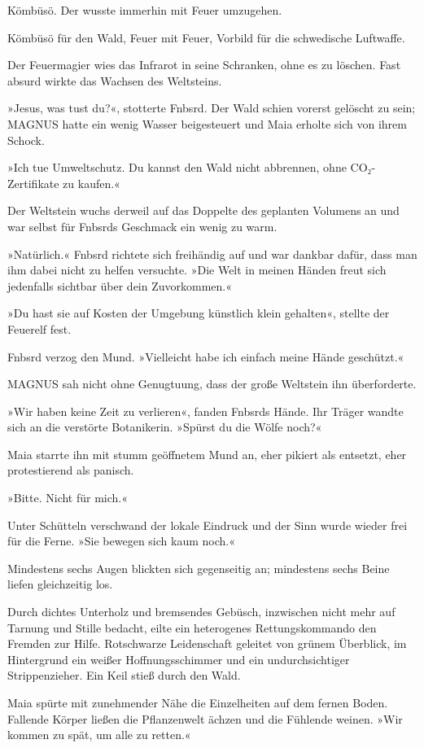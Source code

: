 Kömbüsö. Der wusste immerhin mit Feuer umzugehen.

Kömbüsö für den Wald, Feuer mit Feuer, Vorbild für die schwedische Luftwaffe.

Der Feuermagier wies das Infrarot in seine Schranken, ohne es zu löschen. Fast absurd wirkte das Wachsen des Weltsteins.

»Jesus, was tust du?«, stotterte Fnbsrd. Der Wald schien vorerst gelöscht zu sein; MAGNUS hatte ein wenig Wasser beigesteuert und Maia erholte sich von ihrem Schock.

»Ich tue Umweltschutz. Du kannst den Wald nicht abbrennen, ohne CO₂-Zertifikate zu kaufen.«

Der Weltstein wuchs derweil auf das Doppelte des geplanten Volumens an und war selbst für Fnbsrds Geschmack ein wenig zu warm.

»Natürlich.« Fnbsrd richtete sich freihändig auf und war dankbar dafür, dass man ihm dabei nicht zu helfen versuchte. »Die Welt in meinen Händen freut sich jedenfalls sichtbar über dein Zuvorkommen.«

»Du hast sie auf Kosten der Umgebung künstlich klein gehalten«, stellte der Feuerelf fest.

Fnbsrd verzog den Mund. »Vielleicht habe ich einfach meine Hände geschützt.«

MAGNUS sah nicht ohne Genugtuung, dass der große Weltstein ihn überforderte.

»Wir haben keine Zeit zu verlieren«, fanden Fnbsrds Hände. Ihr Träger wandte sich an die verstörte Botanikerin. »Spürst du die Wölfe noch?«

Maia starrte ihn mit stumm geöffnetem Mund an, eher pikiert als entsetzt, eher protestierend als panisch.

»Bitte. Nicht für mich.«

Unter Schütteln verschwand der lokale Eindruck und der Sinn wurde wieder frei für die Ferne. »Sie bewegen sich kaum noch.«

Mindestens sechs Augen blickten sich gegenseitig an; mindestens sechs Beine liefen gleichzeitig los.

Durch dichtes Unterholz und bremsendes Gebüsch, inzwischen nicht mehr auf Tarnung und Stille bedacht, eilte ein heterogenes Rettungskommando den Fremden zur Hilfe. Rotschwarze Leidenschaft geleitet von grünem Überblick, im Hintergrund ein weißer Hoffnungsschimmer und ein undurchsichtiger Strippenzieher. Ein Keil stieß durch den Wald.

Maia spürte mit zunehmender Nähe die Einzelheiten auf dem fernen Boden. Fallende Körper ließen die Pflanzenwelt ächzen und die Fühlende weinen. »Wir kommen zu spät, um alle zu retten.«

